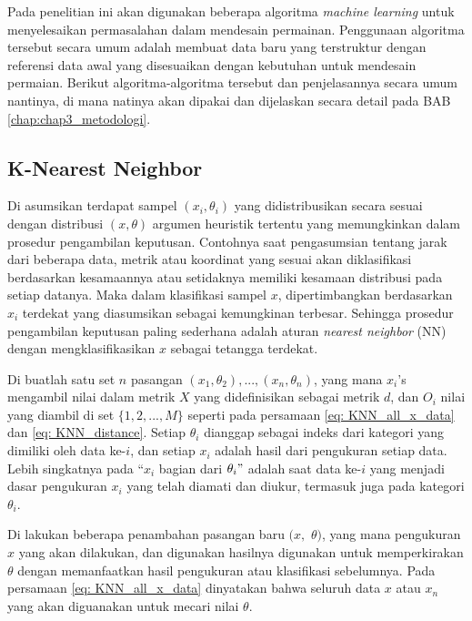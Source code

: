 Pada penelitian ini akan digunakan beberapa algoritma \textit{machine learning} untuk menyelesaikan permasalahan dalam mendesain permainan. Penggunaan algoritma tersebut secara umum adalah membuat data baru yang terstruktur dengan referensi data awal yang disesuaikan dengan kebutuhan untuk mendesain permaian. Berikut algoritma-algoritma tersebut dan penjelasannya secara umum nantinya, di mana natinya akan dipakai dan dijelaskan secara detail pada BAB \ref{chap:chap3_metodologi}.
\vspace{1ex}

\subsection{K-Nearest Neighbor}
\label{sec:sub_sec2_knn}
\vspace{1ex}

Di asumsikan terdapat sampel $(x_{i}, \theta_{i})$ yang didistribusikan secara sesuai dengan distribusi $(x, \theta)$ argumen heuristik tertentu yang memungkinkan dalam prosedur pengambilan keputusan. Contohnya saat pengasumsian tentang jarak dari beberapa data, metrik atau koordinat yang sesuai akan diklasifikasi berdasarkan kesamaannya atau setidaknya memiliki kesamaan distribusi pada setiap datanya. Maka dalam klasifikasi sampel $x$, dipertimbangkan berdasarkan $x_{i}$ terdekat yang diasumsikan sebagai kemungkinan terbesar. Sehingga prosedur pengambilan keputusan paling sederhana adalah aturan \textit{nearest neighbor} (NN) dengan mengklasifikasikan $x$ sebagai tetangga terdekat.
\vspace{1ex}

Di buatlah satu set $n$ pasangan $(x_{1}, \theta_{2}), ..., (x_{n}, \theta_{n})$, yang mana $x_{i}$'s mengambil nilai dalam metrik $X$ yang didefinisikan sebagai metrik $d$, dan $O_{i}$ nilai yang diambil di set $\{1, 2, ..., M\}$ seperti pada persamaan \ref{eq: KNN_all_x_data} dan \ref{eq: KNN_distance}. Setiap $\theta_{i}$ dianggap sebagai indeks dari kategori yang dimiliki oleh data ke-$i$, dan setiap $x_{i}$ adalah hasil dari pengukuran setiap data. Lebih singkatnya pada ``$x_{i}$ bagian dari $\theta_{i}"$ adalah saat data ke-$i$ yang menjadi dasar pengukuran $x_{i}$ yang telah diamati dan diukur, termasuk juga pada kategori $\theta_{i}$.
\vspace{1ex}

Di lakukan beberapa penambahan pasangan baru $(x,$ $\theta)$, yang mana pengukuran $x$ yang akan dilakukan, dan digunakan hasilnya digunakan untuk memperkirakan $\theta$ dengan memanfaatkan hasil pengukuran atau klasifikasi sebelumnya. Pada persamaan \ref{eq: KNN_all_x_data} dinyatakan bahwa seluruh data $x$ atau $x_{n}$ yang akan diguanakan untuk mecari nilai $\theta$.

